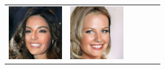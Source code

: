 \documentclass{article}
\newcommand{\pganw}{0.95in}
\begin{document}
\begin{table}[htbp]
\begin{center}
\begin{tabular}{cc|cc|cc}
\includegraphics[width=\pganw]{figures/pgan/63_base_iso_reject.jpg} &
\includegraphics[width=\pganw]{figures/pgan/62_base_iso_MH.jpg} &

\end{tabular}
\end{center}
\end{table}
\end{document}
